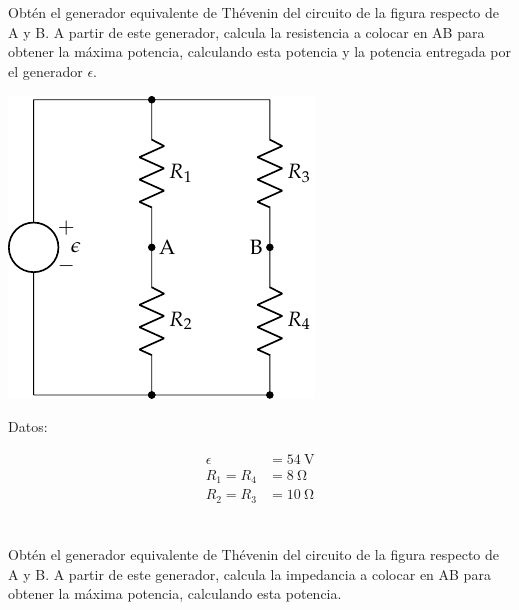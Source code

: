 \documentclass[12pt]{article}
\begin{document}
\noindent\hrulefill

\clearpage

\section{}

Obtén el generador equivalente de Thévenin del circuito de la figura respecto de A y B. A partir de este generador, calcula la resistencia a colocar en AB para obtener la máxima potencia, calculando esta potencia y la potencia entregada por el generador $\epsilon$.

\begin{center}
\includegraphics{figs/Thevenin2}
\end{center}

Datos:

\begin{align*}
  \epsilon &= \SI{54}{\volt}\\
  R_1 = R_4 &= \SI{8}{\ohm}\\
  R_2 = R_3 &= \SI{10}{\ohm}
\end{align*}

\noindent\hrulefill

\clearpage

\section{}

Obtén el generador equivalente de Thévenin del circuito de la figura respecto de A y B. A partir de este generador, calcula la impedancia a colocar en AB para obtener la máxima potencia, calculando esta potencia.
\end{document}
